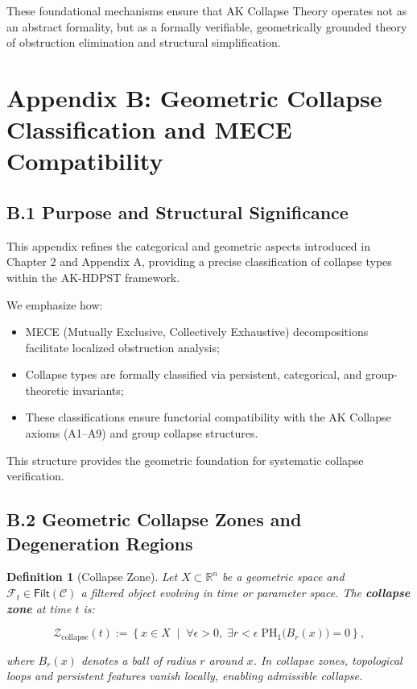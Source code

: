 \documentclass[11pt]{article}
\newtheorem{definition}[theorem]{Definition}
\begin{document}
These foundational mechanisms ensure that AK Collapse Theory operates not as an abstract formality, but as a formally verifiable, geometrically grounded theory of obstruction elimination and structural simplification.



\section*{Appendix B: Geometric Collapse Classification and MECE Compatibility}

\subsection*{B.1 Purpose and Structural Significance}

This appendix refines the categorical and geometric aspects introduced in Chapter 2 and Appendix A, providing a precise classification of collapse types within the AK-HDPST framework.

We emphasize how:

\begin{itemize}
    \item MECE (Mutually Exclusive, Collectively Exhaustive) decompositions facilitate localized obstruction analysis;
    \item Collapse types are formally classified via persistent, categorical, and group-theoretic invariants;
    \item These classifications ensure functorial compatibility with the AK Collapse axioms (A1–A9) and group collapse structures.
\end{itemize}

This structure provides the geometric foundation for systematic collapse verification.

\subsection*{B.2 Geometric Collapse Zones and Degeneration Regions}

\begin{definition}[Collapse Zone]
Let \( X \subset \mathbb{R}^n \) be a geometric space and \( \mathcal{F}_t \in \mathsf{Filt}(\mathcal{C}) \) a filtered object evolving in time or parameter space. The \textbf{collapse zone} at time \( t \) is:

\[
\mathcal{Z}_{\mathrm{collapse}}(t) := \left\{ x \in X \;\middle|\; \forall \epsilon > 0, \; \exists r < \epsilon \; \mathrm{PH}_1\big(B_r(x)\big) = 0 \right\},
\]

where \( B_r(x) \) denotes a ball of radius \( r \) around \( x \). In collapse zones, topological loops and persistent features vanish locally, enabling admissible collapse.

\end{definition}
\end{document}
